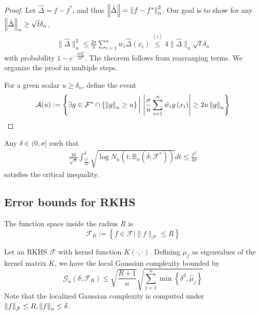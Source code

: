 \begin{proof}
Let $\hat{\Delta} = f - f^*$, and thus $\left\lVert \hat{\Delta} \right\rVert = \left\lVert f - f^* \right\rVert_n^2$. Our goal is to show for any $\left\lVert \hat{\Delta} \right\rVert_n \geq \sqrt{t} \delta_n$,
\begin{align*}
    \|\hat{\Delta}\|_{n}^{2} \leq \frac{2 \sigma}{n} \sum_{i=1}^{n} w_{i} \hat{\Delta}\left(x_{i}\right) \stackrel{(i)} \leq 4\|\hat{\Delta}\|_{n} \sqrt{t} \delta_{n}
\end{align*}
with probability $1 - e^{- \frac{n t \delta^2_n}{2 \sigma^2}}$. The theorem follows from rearranging terms.
We organize the proof in multiple steps.

For a given scalar $u \geq \delta_n$, define the event
$$
\mathcal{A}(u):=\left\{\exists g \in \mathcal{F}^{*} \cap \{\left\lVert g \right\rVert_{n} \geq u\}\, \bigg| \, \left| \frac{\sigma}{n} \sum_{i=1}^{n} \tilde{w}_{i} g\left(x_{i}\right) \right| \geq 2u\left\lVert g \right\rVert_{n}\right\}
$$
\end{proof}

\begin{theorem}
Any $\delta \in (0, \sigma]$ such that
\begin{align*}
    \frac{16}{\sqrt{n}} \int_{\frac{\delta^{2}}{4 \sigma}}^{\delta} \sqrt{\log N_{n}\left(t ; \mathbb{B}_{n}\left(\delta ; \mathscr{F}^{*}\right)\right)} d t \leq \frac{\delta^{2}}{4 \sigma}
\end{align*}
satisfies the critical inequality. 
\end{theorem}

\subsection{Error bounds for RKHS}

\begin{definition} The function space inside the radius $R$ is
$$
\mathcal{F}_{R}:=\left\{f \in \mathcal{F} \mid\|f\|_{\mathcal{F}} \leq R\right\}
$$
\end{definition}
\begin{theorem}
Let an RKHS $\mathcal{F}$ with kernel function $K(\cdot, \cdot)$. Defining $\hat{\mu}_j$ as eigenvalues of the kernel matrix $K$, we have the local Gaussian complexity bounded by
$$
{\mathcal{G}}_{n}\left(\delta; \mathcal{F}_{R}\right) \leq \sqrt{\frac{R + 1}{n}} \sqrt{\sum_{j=1}^{n} \min \left\{\delta^{2}, \hat{\mu}_{j}\right\}}
$$
Note that the localized Gaussian complexity is computed under  $\left\lVert f \right\rVert_\mathcal{F} \leq R, \left\lVert f \right\rVert_n \leq \delta$.
\end{theorem}

